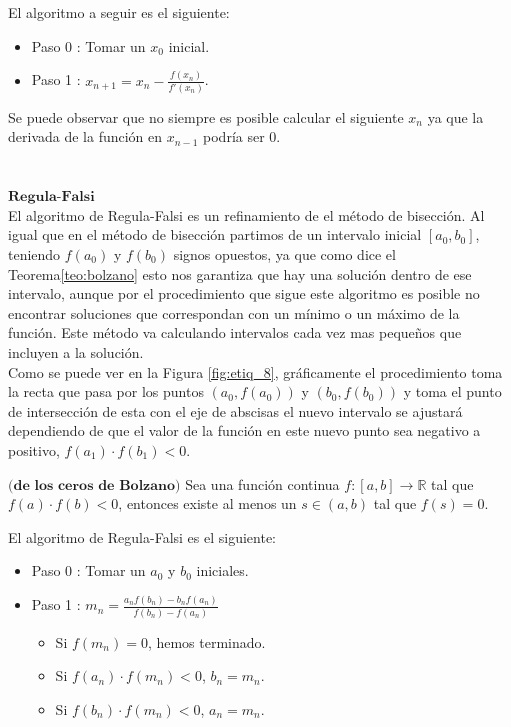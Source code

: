 El algoritmo a seguir es el siguiente:

\begin{itemize}
	\item Paso 0 : Tomar un $x_0$ inicial.
	\item Paso 1 : $x_{n+1} = x_n - \frac{f(x_n)}{f'(x_n)}$.
\end{itemize}

Se puede observar que no siempre es posible calcular el siguiente $x_n$ ya que la derivada de la función en $x_{n-1}$ podría ser $0$.
${ }$\\
${ }$\\

${ }$\\
$\textbf{Regula-Falsi}$
${ }$\\

El algoritmo de Regula-Falsi es un refinamiento de el método de bisección. Al igual que en el método de bisección partimos de un intervalo inicial $[a_0, b_0]$, teniendo $f(a_0)$ y $f(b_0)$ signos opuestos, ya que como dice el Teorema\ref{teo:bolzano} esto nos garantiza que hay una solución dentro de ese intervalo, aunque por el procedimiento que sigue este algoritmo es posible no encontrar soluciones que correspondan con un mínimo o un máximo de la función. Este método va calculando intervalos cada vez mas pequeños que incluyen a la solución.
${ }$\\

Como se puede ver en la Figura \ref{fig:etiq_8}, gráficamente el procedimiento toma la recta que pasa por los puntos $(a_0, f(a_0))$ y $(b_0, f(b_0))$ y toma el punto de intersección de esta con el eje de abscisas el nuevo intervalo se ajustará dependiendo de que el valor de la función en este nuevo punto sea negativo a positivo, $f(a_1) \cdot f(b_1) < 0$.

\begin{teorema}\label{teo:bolzano}
	$\textbf{(de los ceros de Bolzano)}$ Sea una función continua $f : [a,b] \to \mathbb{R}$ tal que $f(a) \cdot f(b) < 0$, entonces existe al menos un $s \in (a,b)$ tal que $f(s) = 0$.
\end{teorema}



El algoritmo de Regula-Falsi es el siguiente:

\begin{itemize}
	\item Paso 0 : Tomar un $a_0$ y $b_0$ iniciales.
	\item Paso 1 : $m_n = \frac{a_n f(b_n) - b_n f(a_n)}{f(b_n) - f(a_n)}$
	\begin{itemize}
		\item Si $f(m_n)=0$, hemos terminado.
		\item Si $f(a_n) \cdot f(m_n) < 0$, $b_n = m_n$.
		\item Si $f(b_n) \cdot f(m_n) < 0$, $a_n = m_n$.
	\end{itemize}
\end{itemize}


